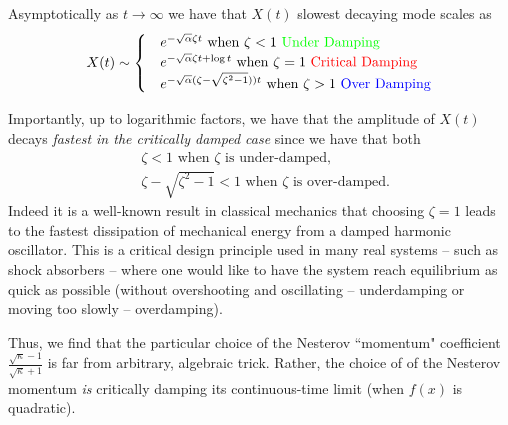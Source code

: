 Asymptotically as $t \to \infty$ we have that $X(t)$ slowest decaying mode scales as
\begin{align*}
   X(t) \sim \begin{cases}
   & e^{-\sqrt{\alpha} \zeta t}\text{ when } \zeta < 1 \ \textcolor{green}{\text{Under Damping}} \\
   & e^{-\sqrt{\alpha} \zeta t + \log t} \text{ when } \zeta = 1 \ \textcolor{red}{\text{Critical Damping}} \\
   & e^{-\sqrt{\alpha}(\zeta - \sqrt{\zeta^2-1})) t}  \text{ when } \zeta > 1 \ \textcolor{blue}{\text{Over Damping}} 
   \end{cases}
\end{align*}

Importantly, up to logarithmic factors, we have that the amplitude of $X(t)$ decays \textit{fastest in the critically damped case} since we have that both
\begin{align*}
    & \zeta < 1 \text{ when } \zeta \text{ is under-damped,} \\
    & \zeta -\sqrt{\zeta^2-1} < 1 \text{ when } \zeta  \text{ is over-damped.}
\end{align*}
Indeed it is a well-known result in classical mechanics that choosing $\zeta=1$ leads to the fastest dissipation of mechanical energy from a damped harmonic oscillator. This is a critical design principle used in many real systems -- such as shock absorbers -- where one would like to have the system reach equilibrium as quick as possible (without overshooting and oscillating -- underdamping or moving too slowly -- overdamping).

Thus, we find that the particular choice of the Nesterov ``momentum" coefficient $\frac{\sqrt{\kappa}-1}{\sqrt{\kappa}+1}$ is far from arbitrary, algebraic trick. Rather, the choice of of the Nesterov momentum \textit{is} critically damping its continuous-time limit (when $f(x)$ is quadratic).

